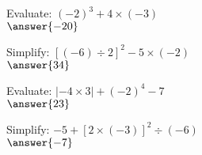 \documentclass{ximera}
\begin{document}
\begin{problem}
Evaluate: $(-2)^3 + 4 \times (-3)$\\
$\answer{-20}$
\end{problem}

\begin{problem}
Simplify: $[(-6) \div 2]^2 - 5 \times (-2)$\\
$\answer{34}$
\end{problem}

\begin{problem}
Evaluate: $| -4 \times 3 | + (-2)^4 - 7$\\
$\answer{23}$
\end{problem}

\begin{problem}
Simplify: $-5 + [2 \times (-3)]^2 \div (-6)$\\
$\answer{-7}$
\end{problem}

\end{document}
